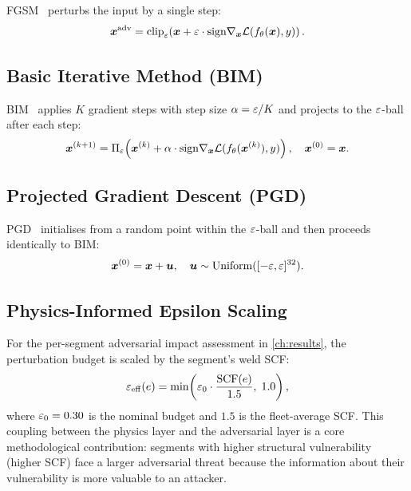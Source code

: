 \ac{FGSM}~\cite{Goodfellow2015} perturbs the input by a single step:
\begin{equation}
  \bm{x}^\mathrm{adv} = \mathrm{clip}_{\varepsilon}\!
    \left(\bm{x} + \varepsilon \cdot \mathrm{sign}
    \nabla_{\bm{x}} \mathcal{L}(f_\theta(\bm{x}), y)\right).
\end{equation}

\subsection{Basic Iterative Method (BIM)}
\label{subsec:adv_bim}

\ac{BIM}~\cite{Kurakin2017} applies $K$ gradient steps with step size
$\alpha = \varepsilon / K$ and projects to the $\varepsilon$-ball after each step:
\begin{equation}
  \bm{x}^{(k+1)} = \Pi_\varepsilon\!
    \left(\bm{x}^{(k)} + \alpha \cdot \mathrm{sign}
    \nabla_{\bm{x}} \mathcal{L}(f_\theta(\bm{x}^{(k)}), y)\right),
  \quad \bm{x}^{(0)} = \bm{x}.
\end{equation}

\subsection{Projected Gradient Descent (PGD)}
\label{subsec:adv_pgd}

\ac{PGD}~\cite{Madry2018} initialises from a random point within the
$\varepsilon$-ball and then proceeds identically to \ac{BIM}:
\begin{equation}
  \bm{x}^{(0)} = \bm{x} + \bm{u}, \quad
  \bm{u} \sim \mathrm{Uniform}([-\varepsilon, \varepsilon]^{32}).
\end{equation}

\subsection{Physics-Informed Epsilon Scaling}
\label{subsec:adv_eps_scaling}

For the per-segment adversarial impact assessment in
\cref{ch:results}, the perturbation budget is scaled by the segment's
weld \acs{SCF}:
\begin{equation}
  \varepsilon_\mathrm{eff}(e) = \min\!\left(\varepsilon_0 \cdot
    \frac{\mathrm{SCF}(e)}{1.5},\; 1.0\right),
  \label{eq:eps_scaling}
\end{equation}
where $\varepsilon_0 = 0.30$ is the nominal budget and $\num{1.5}$ is the
fleet-average \acs{SCF}.  This coupling between the physics layer and the
adversarial layer is a core methodological contribution: segments with
higher structural vulnerability (higher SCF) face a larger adversarial
threat because the information about their vulnerability is more valuable
to an attacker.

